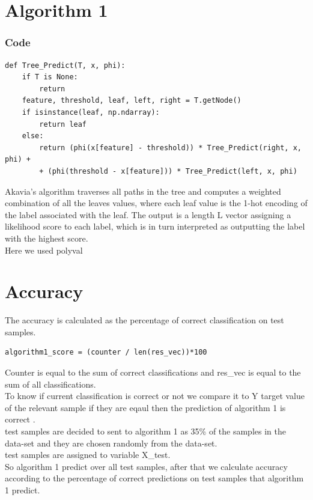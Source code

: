 \documentclass{article}
\begin{document}
\section{Algorithm 1}
\subsubsection{Code}
\begin{lstlisting}
def Tree_Predict(T, x, phi):
    if T is None:
        return
    feature, threshold, leaf, left, right = T.getNode()
    if isinstance(leaf, np.ndarray):
        return leaf
    else:
        return (phi(x[feature] - threshold)) * Tree_Predict(right, x, phi) + 
        + (phi(threshold - x[feature])) * Tree_Predict(left, x, phi)
\end{lstlisting}


Akavia's algorithm traverses all paths in the tree and computes a weighted combination of
all the leaves values, where each leaf value is the 1-hot encoding of the
label associated with the leaf. The output is a length L vector assigning a
likelihood score to each label, which is in turn interpreted as outputting
the label with the highest score.\\
Here we used polyval 



\section{Accuracy}

The accuracy is calculated as the percentage of correct classification on test samples. \\
\begin{lstlisting}
algorithm1_score = (counter / len(res_vec))*100 
\end{lstlisting}

Counter is equal to the sum of correct classifications and res\_vec is equal to the sum of all classifications.\\ 
To know if current classification is correct or not we compare it to Y target value of the relevant sample if they are eqaul then the prediction of algorithm 1 is correct . \\

test samples are decided to sent to algorithm 1 as 35\% of the samples in the data-set and they are chosen randomly from the data-set.\\
test samples are assigned to variable X\_test. \\
So algorithm 1 predict over all test samples, after that we calculate accuracy according to the percentage of correct predictions on test samples that algorithm 1 predict.\\
\end{document}
